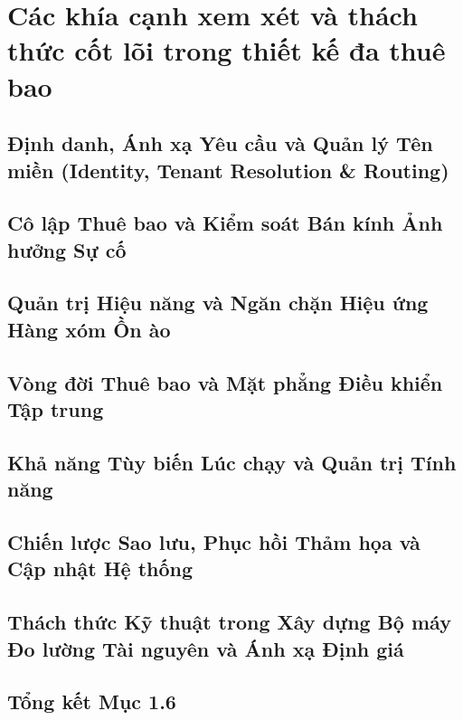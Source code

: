 \par{}
\section{Các khía cạnh xem xét và thách thức cốt lõi trong thiết kế đa thuê bao}
\label{outline:1:challenges:1}

\par{}
\subsection{Định danh, Ánh xạ Yêu cầu và Quản lý Tên miền (Identity, Tenant Resolution \& Routing)}
\label{outline:1:challenges:2}

\par{}
\subsection{Cô lập Thuê bao và Kiểm soát Bán kính Ảnh hưởng Sự cố}
\label{outline:1:challenges:3}

\par{}
\subsection{Quản trị Hiệu năng và Ngăn chặn Hiệu ứng Hàng xóm Ồn ào}
\label{outline:1:challenges:4}

\par{}
\subsection{Vòng đời Thuê bao và Mặt phẳng Điều khiển Tập trung}
\label{outline:1:challenges:5}

\par{}
\subsection{Khả năng Tùy biến Lúc chạy và Quản trị Tính năng}
\label{outline:1:challenges:6}

\par{}
\subsection{Chiến lược Sao lưu, Phục hồi Thảm họa và Cập nhật Hệ thống}
\label{outline:1:challenges:7}

\par{}
\subsection{Thách thức Kỹ thuật trong Xây dựng Bộ máy Đo lường Tài nguyên và Ánh xạ Định giá}
\label{outline:1:challenges:8}

\par{}
\subsection{Tổng kết Mục 1.6}
\label{outline:1:challenges:9}
